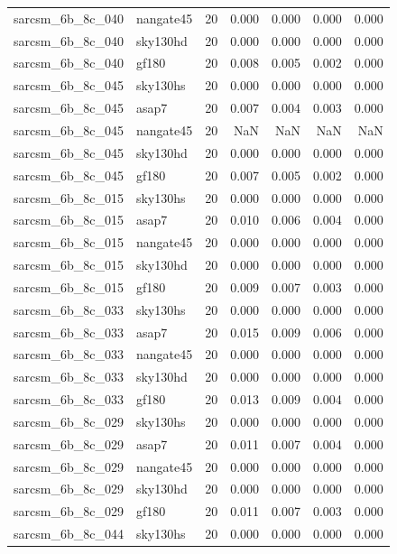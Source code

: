 \begin{tabular}{llrrrrr}
sarcsm\_6b\_8c\_040 & nangate45 & 20 & 0.000 & 0.000 & 0.000 & 0.000 \\
sarcsm\_6b\_8c\_040 & sky130hd & 20 & 0.000 & 0.000 & 0.000 & 0.000 \\
sarcsm\_6b\_8c\_040 & gf180 & 20 & 0.008 & 0.005 & 0.002 & 0.000 \\
sarcsm\_6b\_8c\_045 & sky130hs & 20 & 0.000 & 0.000 & 0.000 & 0.000 \\
sarcsm\_6b\_8c\_045 & asap7 & 20 & 0.007 & 0.004 & 0.003 & 0.000 \\
sarcsm\_6b\_8c\_045 & nangate45 & 20 & NaN & NaN & NaN & NaN \\
sarcsm\_6b\_8c\_045 & sky130hd & 20 & 0.000 & 0.000 & 0.000 & 0.000 \\
sarcsm\_6b\_8c\_045 & gf180 & 20 & 0.007 & 0.005 & 0.002 & 0.000 \\
sarcsm\_6b\_8c\_015 & sky130hs & 20 & 0.000 & 0.000 & 0.000 & 0.000 \\
sarcsm\_6b\_8c\_015 & asap7 & 20 & 0.010 & 0.006 & 0.004 & 0.000 \\
sarcsm\_6b\_8c\_015 & nangate45 & 20 & 0.000 & 0.000 & 0.000 & 0.000 \\
sarcsm\_6b\_8c\_015 & sky130hd & 20 & 0.000 & 0.000 & 0.000 & 0.000 \\
sarcsm\_6b\_8c\_015 & gf180 & 20 & 0.009 & 0.007 & 0.003 & 0.000 \\
sarcsm\_6b\_8c\_033 & sky130hs & 20 & 0.000 & 0.000 & 0.000 & 0.000 \\
sarcsm\_6b\_8c\_033 & asap7 & 20 & 0.015 & 0.009 & 0.006 & 0.000 \\
sarcsm\_6b\_8c\_033 & nangate45 & 20 & 0.000 & 0.000 & 0.000 & 0.000 \\
sarcsm\_6b\_8c\_033 & sky130hd & 20 & 0.000 & 0.000 & 0.000 & 0.000 \\
sarcsm\_6b\_8c\_033 & gf180 & 20 & 0.013 & 0.009 & 0.004 & 0.000 \\
sarcsm\_6b\_8c\_029 & sky130hs & 20 & 0.000 & 0.000 & 0.000 & 0.000 \\
sarcsm\_6b\_8c\_029 & asap7 & 20 & 0.011 & 0.007 & 0.004 & 0.000 \\
sarcsm\_6b\_8c\_029 & nangate45 & 20 & 0.000 & 0.000 & 0.000 & 0.000 \\
sarcsm\_6b\_8c\_029 & sky130hd & 20 & 0.000 & 0.000 & 0.000 & 0.000 \\
sarcsm\_6b\_8c\_029 & gf180 & 20 & 0.011 & 0.007 & 0.003 & 0.000 \\
sarcsm\_6b\_8c\_044 & sky130hs & 20 & 0.000 & 0.000 & 0.000 & 0.000 \\

\end{tabular}
